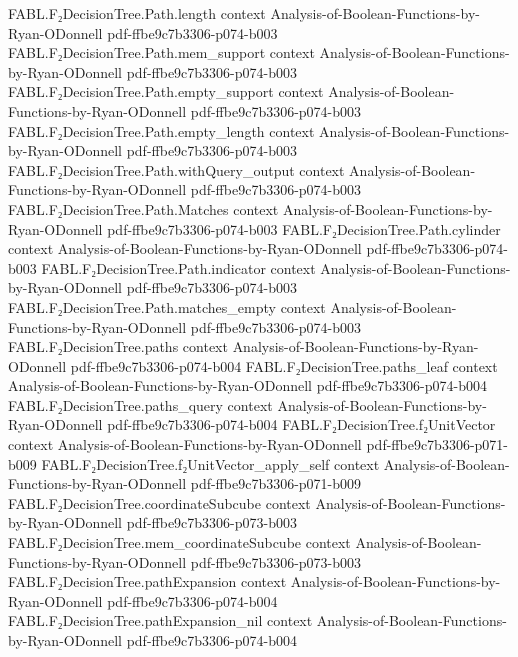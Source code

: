 \begin{theorem}
\proofstep
  {FABL.F₂DecisionTree.Path.length}
  {context}
  {Analysis-of-Boolean-Functions-by-Ryan-ODonnell}
  {pdf-ffbe9c7b3306-p074-b003}
\proofstep
  {FABL.F₂DecisionTree.Path.mem_support}
  {context}
  {Analysis-of-Boolean-Functions-by-Ryan-ODonnell}
  {pdf-ffbe9c7b3306-p074-b003}
\proofstep
  {FABL.F₂DecisionTree.Path.empty_support}
  {context}
  {Analysis-of-Boolean-Functions-by-Ryan-ODonnell}
  {pdf-ffbe9c7b3306-p074-b003}
\proofstep
  {FABL.F₂DecisionTree.Path.empty_length}
  {context}
  {Analysis-of-Boolean-Functions-by-Ryan-ODonnell}
  {pdf-ffbe9c7b3306-p074-b003}
\proofstep
  {FABL.F₂DecisionTree.Path.withQuery_output}
  {context}
  {Analysis-of-Boolean-Functions-by-Ryan-ODonnell}
  {pdf-ffbe9c7b3306-p074-b003}
\proofstep
  {FABL.F₂DecisionTree.Path.Matches}
  {context}
  {Analysis-of-Boolean-Functions-by-Ryan-ODonnell}
  {pdf-ffbe9c7b3306-p074-b003}
\proofstep
  {FABL.F₂DecisionTree.Path.cylinder}
  {context}
  {Analysis-of-Boolean-Functions-by-Ryan-ODonnell}
  {pdf-ffbe9c7b3306-p074-b003}
\proofstep
  {FABL.F₂DecisionTree.Path.indicator}
  {context}
  {Analysis-of-Boolean-Functions-by-Ryan-ODonnell}
  {pdf-ffbe9c7b3306-p074-b003}
\proofstep
  {FABL.F₂DecisionTree.Path.matches_empty}
  {context}
  {Analysis-of-Boolean-Functions-by-Ryan-ODonnell}
  {pdf-ffbe9c7b3306-p074-b003}
\proofstep
  {FABL.F₂DecisionTree.paths}
  {context}
  {Analysis-of-Boolean-Functions-by-Ryan-ODonnell}
  {pdf-ffbe9c7b3306-p074-b004}
\proofstep
  {FABL.F₂DecisionTree.paths_leaf}
  {context}
  {Analysis-of-Boolean-Functions-by-Ryan-ODonnell}
  {pdf-ffbe9c7b3306-p074-b004}
\proofstep
  {FABL.F₂DecisionTree.paths_query}
  {context}
  {Analysis-of-Boolean-Functions-by-Ryan-ODonnell}
  {pdf-ffbe9c7b3306-p074-b004}
\proofstep
  {FABL.F₂DecisionTree.f₂UnitVector}
  {context}
  {Analysis-of-Boolean-Functions-by-Ryan-ODonnell}
  {pdf-ffbe9c7b3306-p071-b009}
\proofstep
  {FABL.F₂DecisionTree.f₂UnitVector_apply_self}
  {context}
  {Analysis-of-Boolean-Functions-by-Ryan-ODonnell}
  {pdf-ffbe9c7b3306-p071-b009}
\proofstep
  {FABL.F₂DecisionTree.coordinateSubcube}
  {context}
  {Analysis-of-Boolean-Functions-by-Ryan-ODonnell}
  {pdf-ffbe9c7b3306-p073-b003}
\proofstep
  {FABL.F₂DecisionTree.mem_coordinateSubcube}
  {context}
  {Analysis-of-Boolean-Functions-by-Ryan-ODonnell}
  {pdf-ffbe9c7b3306-p073-b003}
\proofstep
  {FABL.F₂DecisionTree.pathExpansion}
  {context}
  {Analysis-of-Boolean-Functions-by-Ryan-ODonnell}
  {pdf-ffbe9c7b3306-p074-b004}
\proofstep
  {FABL.F₂DecisionTree.pathExpansion_nil}
  {context}
  {Analysis-of-Boolean-Functions-by-Ryan-ODonnell}
  {pdf-ffbe9c7b3306-p074-b004}

\end{theorem}
